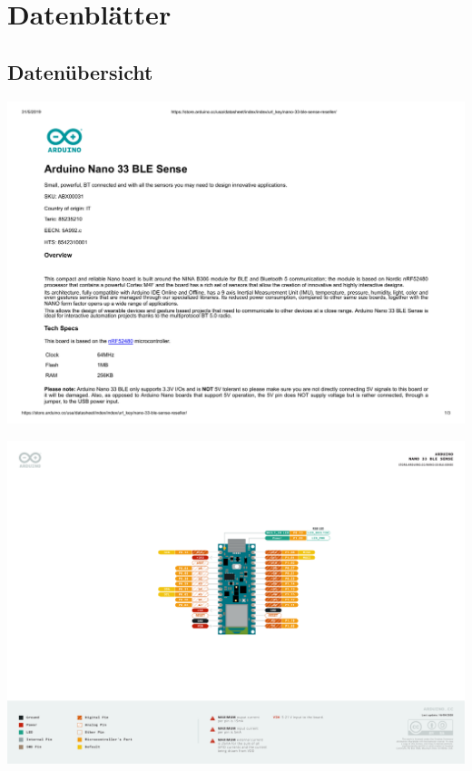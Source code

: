 %
%


\chapter{Datenblätter}

\section{Datenübersicht}


\setcounter{mycounter}{1}

{
	\includegraphics[width=1\textwidth,page=\themycounter]{../../MLbib/Arduino/Nano33BLESense/ABX00031_ENG_TDS.pdf}
	\newpage
}



\setcounter{mycounter}{1}

{
  \includegraphics[width=1\textwidth,page=\themycounter]{../../MLbib/Arduino/Nano33BLESense/Pinout-NANOsense_latest.pdf}
  \newpage
}

